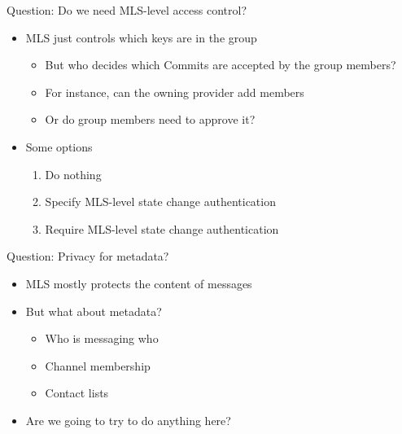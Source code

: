 \documentclass[helvetica]{beamer}
\begin{document}
\begin{frame}{Question: Do we need MLS-level access control?}
  \begin{itemize}
  \item MLS just controls which keys are in the group
    \begin{itemize}
    \item But who decides which Commits are accepted by the group members?
    \item For instance, can the owning provider add members 
    \item Or do group members need to approve it?      
    \end{itemize}
    
  \item Some options
    \begin{enumerate}
    \item Do nothing
    \item Specify MLS-level state change authentication
    \item Require MLS-level state change authentication     
    \end{enumerate}
  \end{itemize}
  
\end{frame}

\begin{frame}{Question: Privacy for metadata?}

  \begin{itemize}
  \item MLS mostly protects the content of messages
  \item But what about metadata?
    \begin{itemize}
    \item Who is messaging who      
    \item Channel membership
    \item Contact lists
    \end{itemize}
  \item Are we going to try to do anything here?    
  \end{itemize}
\end{frame}
\end{document}
